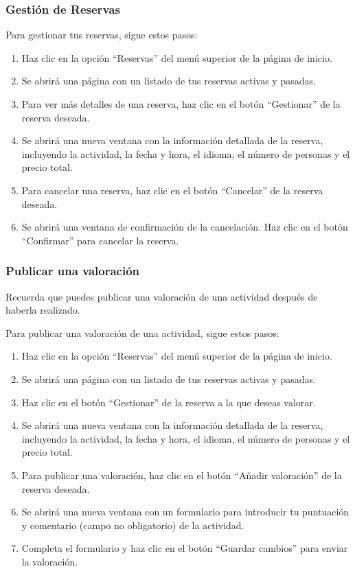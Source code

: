 \subsubsection{Gestión de Reservas}
Para gestionar tus reservas, sigue estos pasos:
\begin{enumerate}
	\item Haz clic en la opción “Reservas” del menú superior de la página de inicio.
	\item Se abrirá una página con un listado de tus reservas activas y pasadas.
	\item Para ver más detalles de una reserva, haz clic en el botón “Gestionar” de la reserva deseada.
	\item Se abrirá una nueva ventana con la información detallada de la reserva, incluyendo la actividad, la fecha y hora, el idioma, el número de personas y el precio total.
	\item Para cancelar una reserva, haz clic en el botón “Cancelar” de la reserva deseada.
	\item Se abrirá una ventana de confirmación de la cancelación. Haz clic en el botón “Confirmar” para cancelar la reserva.
\end{enumerate}

\subsubsection{Publicar una valoración}
Recuerda que puedes publicar una valoración de una actividad después de haberla realizado.

Para publicar una valoración de una actividad, sigue estos pasos:
\begin{enumerate}
	\item Haz clic en la opción “Reservas” del menú superior de la página de inicio.
	\item Se abrirá una página con un listado de tus reservas activas y pasadas.
	\item Haz clic en el botón “Gestionar” de la reserva a la que deseas valorar.
	\item Se abrirá una nueva ventana con la información detallada de la reserva, incluyendo la actividad, la fecha y hora, el idioma, el número de personas y el precio total.
	\item Para publicar una valoración, haz clic en el botón “Añadir valoración” de la reserva deseada.
	\item Se abrirá una nueva ventana con un formulario para introducir tu puntuación y comentario (campo no obligatorio) de la actividad.
	\item Completa el formulario y haz clic en el botón “Guardar cambios” para enviar la valoración.
\end{enumerate}

